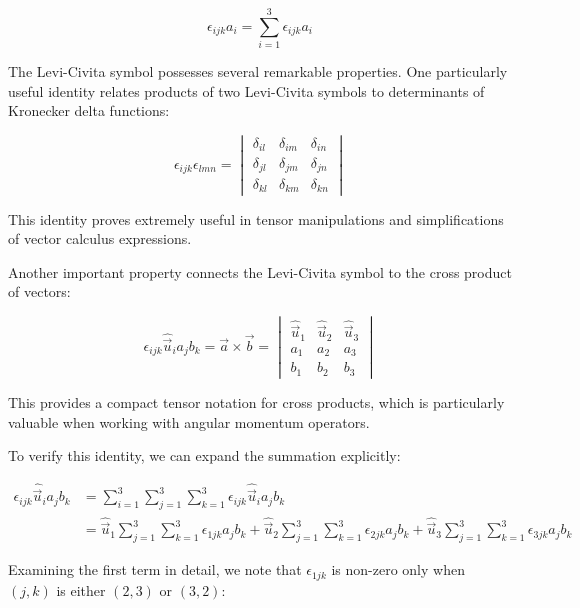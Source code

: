 \documentclass[italian]{HKNdocument}
\begin{document}
\begin{equation*}
\epsilon_{i j k} a_{i}=\sum_{i=1}^3 \epsilon_{i j k} a_{i} \tag{1.44}
\end{equation*}

The Levi-Civita symbol possesses several remarkable properties. One particularly useful identity relates products of two Levi-Civita symbols to determinants of Kronecker delta functions:

\[
\epsilon_{i j k} \epsilon_{l m n}=\begin{vmatrix}
\delta_{i l} & \delta_{i m} & \delta_{i n} \tag{1.45}\\
\delta_{j l} & \delta_{j m} & \delta_{j n} \\
\delta_{k l} & \delta_{k m} & \delta_{k n}
\end{vmatrix}
\]

This identity proves extremely useful in tensor manipulations and simplifications of vector calculus expressions.

Another important property connects the Levi-Civita symbol to the cross product of vectors:

\[
\epsilon_{i j k} \hat{\vec{u}}_{i} a_{j} b_{k}=\vec{a} \times \vec{b}=\begin{vmatrix}
\hat{\vec{u}}_{1} & \hat{\vec{u}}_{2} & \hat{\vec{u}}_{3} \tag{1.46}\\
a_{1} & a_{2} & a_{3} \\
b_{1} & b_{2} & b_{3}
\end{vmatrix}
\]

This provides a compact tensor notation for cross products, which is particularly valuable when working with angular momentum operators.

To verify this identity, we can expand the summation explicitly:


\begin{align*}
\epsilon_{i j k} \hat{\vec{u}}_{i} a_{j} b_{k} &= \sum_{i=1}^{3} \sum_{j=1}^{3} \sum_{k=1}^{3} \epsilon_{i j k} \hat{\vec{u}}_{i} a_{j} b_{k} \\
&= \hat{\vec{u}}_{1} \sum_{j=1}^{3} \sum_{k=1}^{3} \epsilon_{1 j k} a_{j} b_{k} + \hat{\vec{u}}_{2} \sum_{j=1}^{3} \sum_{k=1}^{3} \epsilon_{2 j k} a_{j} b_{k} + \hat{\vec{u}}_{3} \sum_{j=1}^{3} \sum_{k=1}^{3} \epsilon_{3 j k} a_{j} b_{k} \tag{1.47}
\end{align*}

Examining the first term in detail, we note that $\epsilon_{1jk}$ is non-zero only when $(j,k)$ is either $(2,3)$ or $(3,2)$:
\end{document}
